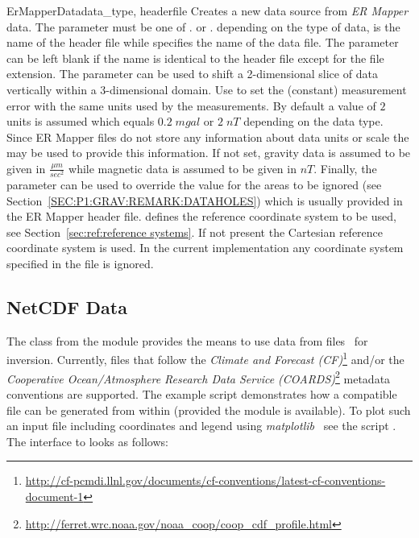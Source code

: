 \begin{classdesc}{ErMapperData}{data_type, headerfile%
%
%
%
%
}
Creates a new data source from \emph{ER Mapper} data.
The parameter  must be one of
. or .
depending on the type of data,  is the name of the header
file while  specifies the name of the data file.
The parameter  can be left blank if the name is identical to
the header file except for the file extension.
The  parameter can be used to shift a 2-dimensional slice of
data vertically within a 3-dimensional domain.
Use  to set the (constant) measurement error with the same units
used by the measurements. By default a value of $2$ units is assumed which
equals $0.2 \; mgal$ or $2 \; nT$ depending on the data type.
Since ER Mapper files do not store any information about data units or scale
the  may be used to provide this information.
If not set, gravity data is assumed to be given in $\frac{\mu m}{sec^2}$ while
magnetic data is assumed to be given in $nT$.
Finally, the  parameter can be used to override the value
for the areas to be ignored (see Section~\ref{SEC:P1:GRAV:REMARK:DATAHOLES})
which is usually provided in the ER Mapper header file.
 defines the reference coordinate system to be used, see Section~\ref{sec:ref:reference systems}.
If not present the Cartesian reference coordinate system is used. In the current implementation any
coordinate system specified in the file is ignored.
\end{classdesc}

\subsection{NetCDF Data}\label{sec:ref:DataSource:NETCDF}
The  class from the  module
provides the means to use data from \netcdf files~\cite{NETCDF} for inversion.
Currently, files that follow the \emph{Climate and Forecast (CF)}\footnote{%
\url{http://cf-pcmdi.llnl.gov/documents/cf-conventions/latest-cf-conventions-document-1}}
and/or the \emph{Cooperative Ocean/Atmosphere Research Data Service (COARDS)}\footnote{%
\url{http://ferret.wrc.noaa.gov/noaa_coop/coop_cdf_profile.html}} metadata
conventions are supported.
The example script  demonstrates how a compatible
file can be generated from within \Python (provided the  module
is available).
To plot such an input file including coordinates and legend using
\emph{matplotlib}~\cite{matplotlib} see the script .
The interface to  looks as follows:

